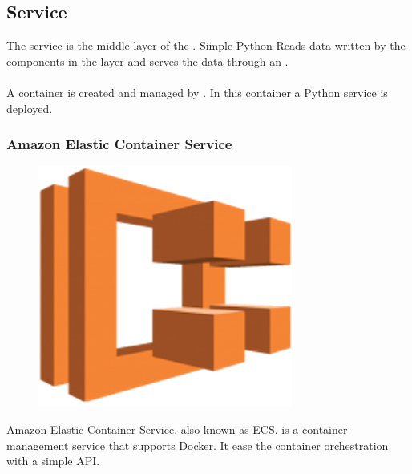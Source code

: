 
\subsection{Service} \label{service}

The service is the middle layer of the \thesis. Simple Python\cite{python} Reads data written by the components in the  layer and serves the data through an .
\\\\
A  container is created and managed by . In this container a Python\cite{python} service is deployed.


\subsubsection{Amazon Elastic Container Service} \label{ecs}

\begin{figure}[H]
\includegraphics[scale=0.1]{resources/ecs-logo.png}
\end{figure}

Amazon Elastic Container Service, also known as ECS\cite{ecs}, is a container management service that supports Docker. It ease the container orchestration with a simple API.

